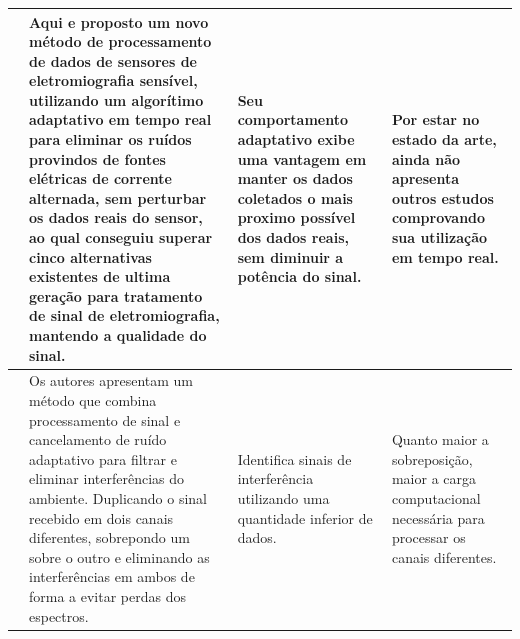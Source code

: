 \begin{longtable}{|p{2cm}|p{4cm}|p{3.5cm}|p{3.5cm}|}
    \cite{Kaan_emg} &   Aqui e proposto um novo método de processamento de dados de sensores de eletromiografia sensível, utilizando um algorítimo adaptativo em tempo real para eliminar os ruídos provindos de fontes elétricas de corrente alternada, sem perturbar os dados reais do sensor, ao qual conseguiu superar cinco alternativas existentes de ultima geração para tratamento de sinal de eletromiografia, mantendo a qualidade do sinal.  &  Seu comportamento adaptativo exibe uma vantagem em manter os dados coletados o mais proximo possível dos dados reais, sem diminuir a potência do sinal. & Por estar no estado da arte, ainda não apresenta outros estudos comprovando sua utilização em tempo real. \\ \hline
    
    \cite{Zhou_ambient} &   Os autores apresentam um método que combina processamento de sinal e cancelamento de ruído adaptativo para filtrar e eliminar interferências do ambiente. Duplicando o sinal recebido em dois canais diferentes, sobrepondo um sobre o outro e eliminando as interferências em ambos de forma a evitar perdas dos espectros. &   Identifica sinais de interferência utilizando uma quantidade inferior de dados. & Quanto maior a sobreposição, maior a carga computacional necessária para processar os canais diferentes. \\ \hline
    
\end{longtable}




